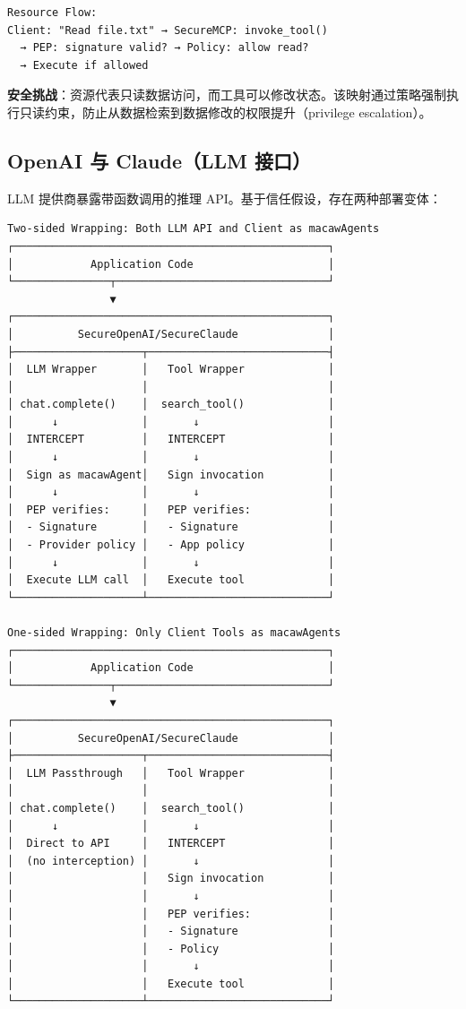 {{\begin{verbatim}
Resource Flow:
Client: "Read file.txt" → SecureMCP: invoke_tool()
  → PEP: signature valid? → Policy: allow read?
  → Execute if allowed
\end{verbatim}}

\textbf{安全挑战}：资源代表只读数据访问，而工具可以修改状态。该映射通过策略强制执行只读约束，防止从数据检索到数据修改的权限提升（privilege escalation）。

\subsection*{OpenAI 与 Claude（LLM 接口）}

LLM 提供商暴露带函数调用的推理 API。基于信任假设，存在两种部署变体：

{\tiny
\begin{verbatim}
Two-sided Wrapping: Both LLM API and Client as macawAgents
┌─────────────────────────────────────────────────┐
│            Application Code                     │
└───────────────┬─────────────────────────────────┘
                ▼
┌─────────────────────────────────────────────────┐
│          SecureOpenAI/SecureClaude              │
├────────────────────┬────────────────────────────┤
│  LLM Wrapper       │   Tool Wrapper             │
│                    │                            │
│ chat.complete()    │  search_tool()             │
│      ↓             │       ↓                    │
│  INTERCEPT         │   INTERCEPT                │
│      ↓             │       ↓                    │
│  Sign as macawAgent│   Sign invocation          │
│      ↓             │       ↓                    │
│  PEP verifies:     │   PEP verifies:            │
│  - Signature       │   - Signature              │
│  - Provider policy │   - App policy             │
│      ↓             │       ↓                    │
│  Execute LLM call  │   Execute tool             │
└────────────────────┴────────────────────────────┘

One-sided Wrapping: Only Client Tools as macawAgents
┌─────────────────────────────────────────────────┐
│            Application Code                     │
└───────────────┬─────────────────────────────────┘
                ▼
┌─────────────────────────────────────────────────┐
│          SecureOpenAI/SecureClaude              │
├────────────────────┬────────────────────────────┤
│  LLM Passthrough   │   Tool Wrapper             │
│                    │                            │
│ chat.complete()    │  search_tool()             │
│      ↓             │       ↓                    │
│  Direct to API     │   INTERCEPT                │
│  (no interception) │       ↓                    │
│                    │   Sign invocation          │
│                    │       ↓                    │
│                    │   PEP verifies:            │
│                    │   - Signature              │
│                    │   - Policy                 │
│                    │       ↓                    │
│                    │   Execute tool             │
└────────────────────┴────────────────────────────┘
\end{verbatim}}

}

